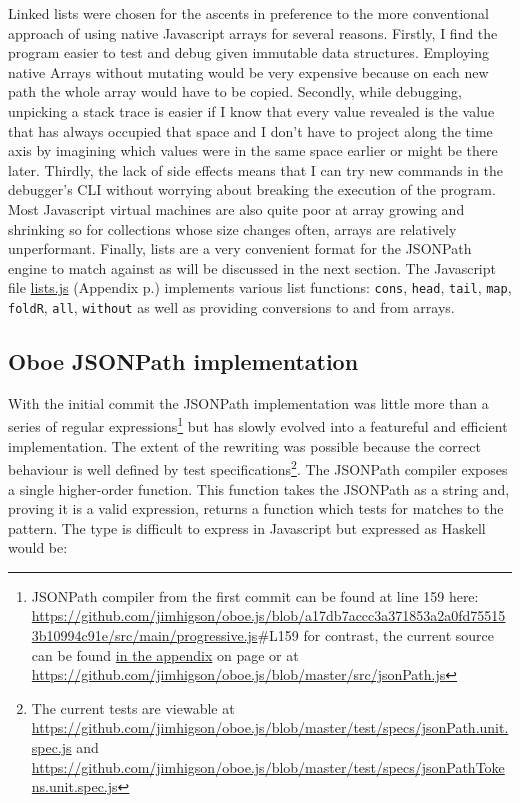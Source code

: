 \documentclass[12pt, ]{article}
\begin{document}
Linked lists were chosen for the ascents in preference to the more
conventional approach of using native Javascript arrays for several
reasons. Firstly, I find the program easier to test and debug given
immutable data structures. Employing native Arrays without mutating
would be very expensive because on each new path the whole array would
have to be copied. Secondly, while debugging, unpicking a stack trace is
easier if I know that every value revealed is the value that has always
occupied that space and I don't have to project along the time axis by
imagining which values were in the same space earlier or might be there
later. Thirdly, the lack of side effects means that I can try new
commands in the debugger's CLI without worrying about breaking the
execution of the program. Most Javascript virtual machines are also
quite poor at array growing and shrinking so for collections whose size
changes often, arrays are relatively unperformant. Finally, lists are a
very convenient format for the JSONPath engine to match against as will
be discussed in the next section. The Javascript file
\hyperref[headerux5flists]{lists.js} (Appendix p.\pageref{src_lists})
implements various list functions: \texttt{cons}, \texttt{head},
\texttt{tail}, \texttt{map}, \texttt{foldR}, \texttt{all},
\texttt{without} as well as providing conversions to and from arrays.

\subsection{Oboe JSONPath
implementation}\label{oboe-jsonpath-implementation}

With the initial commit the JSONPath implementation was little more than
a series of regular expressions\footnote{JSONPath compiler from the
  first commit can be found at line 159 here:
  \url{https://github.com/jimhigson/oboe.js/blob/a17db7accc3a371853a2a0fd755153b10994c91e/src/main/progressive.js}\#L159
  for contrast, the current source can be found
  \hyperref[jsonPath.js]{in the appendix} on page \pageref{src_jsonPath}
  or at
  \url{https://github.com/jimhigson/oboe.js/blob/master/src/jsonPath.js}}
but has slowly evolved into a featureful and efficient implementation.
The extent of the rewriting was possible because the correct behaviour
is well defined by test specifications\footnote{The current tests are
  viewable at
  \url{https://github.com/jimhigson/oboe.js/blob/master/test/specs/jsonPath.unit.spec.js}
  and
  \url{https://github.com/jimhigson/oboe.js/blob/master/test/specs/jsonPathTokens.unit.spec.js}}.
The JSONPath compiler exposes a single higher-order function. This
function takes the JSONPath as a string and, proving it is a valid
expression, returns a function which tests for matches to the pattern.
The type is difficult to express in Javascript but expressed as Haskell
would be:
\end{document}

